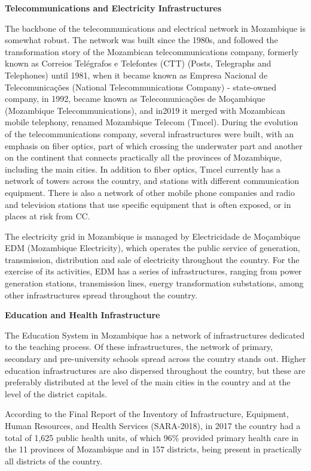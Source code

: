\documentclass[
]{book}
\begin{document}
\textbf{Telecommunications and Electricity Infrastructures}

The backbone of the telecommunications and electrical network in Mozambique is somewhat robust. The network was built since the 1980s, and followed the transformation story of the Mozambican telecommunications company, formerly known as Correios Telégrafos e Telefontes (CTT) (Posts, Telegraphs and Telephones) until 1981, when it became known as Empresa Nacional de Telecomunicações (National Telecommunications Company) - state-owned company, in 1992, became known as Telecomunicações de Moçambique (Mozambique Telecommunications), and in2019 it merged with Mozambican mobile telephony, renamed Mozambique Telecom (Tmcel). During the evolution of the telecommunications company, several infrastructures were built, with an emphasis on fiber optics, part of which crossing the underwater part and another on the continent that connects practically all the provinces of Mozambique, including the main cities. In addition to fiber optics, Tmcel currently has a network of towers across the country, and stations with different communication equipment. There is also a network of other mobile phone companies and radio and television stations that use specific equipment that is often exposed, or in places at risk from CC.

The electricity grid in Mozambique is managed by Electricidade de Moçambique EDM (Mozambique Electricity), which operates the public service of generation, transmission, distribution and sale of electricity throughout the country. For the exercise of its activities, EDM has a series of infrastructures, ranging from power generation stations, transmission lines, energy transformation substations, among other infrastructures spread throughout the country.

\textbf{Education and Health Infrastructure}

The Education System in Mozambique has a network of infrastructures dedicated to the teaching process. Of these infrastructures, the network of primary, secondary and pre-university schools spread across the country stands out. Higher education infrastructures are also dispersed throughout the country, but these are preferably distributed at the level of the main cities in the country and at the level of the district capitals.

According to the Final Report of the Inventory of Infrastructure, Equipment, Human Resources, and Health Services (SARA-2018), in 2017 the country had a total of 1,625 public health units, of which 96\% provided primary health care in the 11 provinces of Mozambique and in 157 districts, being present in practically all districts of the country.
\end{document}
